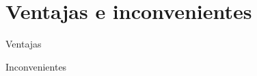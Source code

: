 
\section{Ventajas e inconvenientes}

	\begin{frame}{Ventajas}
    \end{frame}

	\begin{frame}{Inconvenientes}
	\end{frame}
